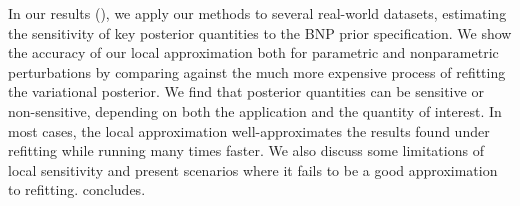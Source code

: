 In our results (),
we apply our methods to several real-world datasets, estimating the sensitivity
of key posterior quantities to
the BNP prior specification.
We show the accuracy of our local approximation both for
parametric and nonparametric perturbations by comparing
against the much more expensive process of refitting the variational posterior.
We find that posterior quantities can be sensitive or non-sensitive,
depending on both the application and the quantity of interest.
In most cases, the local approximation well-approximates the results found under
refitting while running many times faster.
We also discuss some limitations of local sensitivity
and present scenarios where it fails to be a good approximation to refitting.
 concludes.
